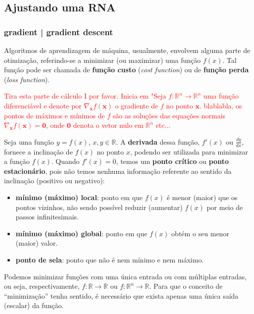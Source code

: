 \documentclass{automatextcc}
\newcommand{\pumi}[1]{\textcolor{red}{#1}}
\newcommand{\R}{\mathds{R}}
\newcommand{\bs}[1]{\boldsymbol{#1}}
\begin{document}


\subsection{Ajustando uma RNA}



\subsubsection{gradient | gradient descent}
Algoritmos de aprendizagem de máquina, usualmente, envolvem alguma parte de otimização, referindo-se a minimizar (ou maximizar) uma função $f(x)$. Tal função pode ser chamada de \textbf{função custo} (\textit{cost function}) ou de \textbf{função perda} (\textit{loss function}). 


\pumi{Tira esta parte de cálculo I por favor. Inicia em "Seja $f:\R^n\rightarrow\R^n$ uma função diferenciável e denote por $\nabla_{\bs{x}} f(\bs{x})$ o gradiente de $f$ no ponto $\bs x$. blablabla, os pontos de máximos e mínimos de $f$ são as soluções das equações normais $\nabla_{\bs{x}} f(\bs{x})=\bs0$, onde $\bs0$ denota o vetor nulo em $\R^n$ etc...}


Seja uma função $y=f(x)$, $x,y \in \R$. A \textbf{derivada} dessa função, $f'(x)$ ou $\frac{dy}{dx}$, fornece a inclinação de $f(x)$ no ponto $x$, podendo ser utilizada para minimizar a função $f(x)$. Quando $f'(x)=0$, temos um \textbf{ponto crítico} ou \textbf{ponto estacionário}, pois não temos nenhuma informação referente ao sentido da inclinação (positivo ou negativo):
\begin{itemize} %
    \item \textbf{mínimo (máximo) local}: ponto em que $f(x)$ é menor (maior) que os pontos vizinhos, não sendo possível reduzir (aumentar) $f(x)$ por meio de passos infinitesimais.
    \item \textbf{mínimo (máximo) global}: ponto em que $f(x)$ obtém o seu menor (maior) valor.
    \item \textbf{ponto de sela}: ponto que não é nem mínimo e nem máximo.
\end{itemize}
Podemos minimizar funções com uma única entrada ou com múltiplas entradas, ou seja, respectivamente, $f: \R \rightarrow \R$ ou $f: \R^n \rightarrow \R$. Para que o conceito de ``minimização'' tenha sentido, é necessário que exista apenas uma única saída (escalar) da função.
\end{document}

